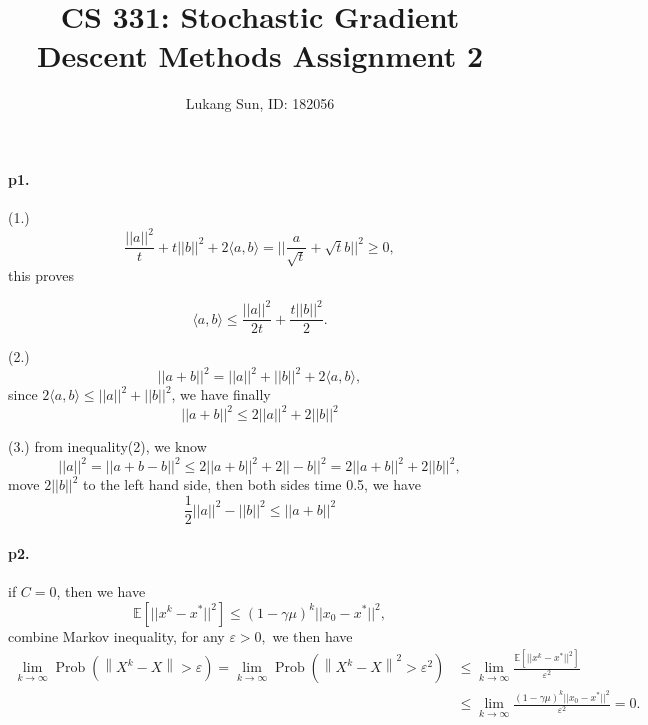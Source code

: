 \documentclass[12pt,a4paper]{article}
\title{CS 331: Stochastic Gradient Descent Methods Assignment 2}
\author{Lukang Sun, ID: 182056}
\begin{document}
	\maketitle
	\paragraph{p1.}
	(1.)\begin{equation*}
		\frac{||a||^2}{t}+t||b||^2+2\langle a,b\rangle = ||\frac{a}{\sqrt{t}}+\sqrt{t}b||^2\geq 0,
	\end{equation*}
	this proves 
	
	\begin{equation}
		\langle a,b\rangle\leq \frac{||a||^2}{2t}+\frac{t||b||^2}{2}.
	\end{equation}
	
	(2.)
	\begin{equation*}
		||a+b||^2=||a||^2+||b||^2+2\langle a,b\rangle,
	\end{equation*}
		since $2\langle a,b\rangle\leq ||a||^2+||b||^2$, we have finally
		\begin{equation}
			||a+b||^2\leq 2||a||^2+2||b||^2
		\end{equation}
	
	(3.)
	from inequality(2), we know
	\begin{equation*}
		||a||^2=||a+b-b||^2\leq 2||a+b||^2+2||-b||^2=2||a+b||^2+2||b||^2,
	\end{equation*}
	 move $2||b||^2$ to the left hand side, then both sides time 0.5, we have 
	 \begin{equation}
	 	\frac{1}{2}||a||^2-||b||^2\leq ||a+b||^2
	 \end{equation}
 
 \paragraph{p2.}
  if $C=0$, then we have 
  \begin{equation*}
  	\mathbb{E}[||x^k-x^*||^2]\leq (1-\gamma \mu)^k||x_0-x^*||^2,
  \end{equation*}
combine Markov inequality, for any $\varepsilon>0,$ we then have 
\begin{equation*}
	\begin{aligned}
		\lim _{k \rightarrow \infty} \operatorname{Prob}\left(\left\|X^{k}-X\right\|>\varepsilon\right)=\lim _{k \rightarrow \infty} \operatorname{Prob}\left(\left\|X^{k}-X\right\|^2>\varepsilon^2\right)& \leq 	\lim _{k \rightarrow \infty}\frac{\mathbb{E}[||x^k-x^*||^2]}{\varepsilon^2}\\
		&\leq \lim_{k \rightarrow \infty}\frac{(1-\gamma \mu)^k||x_0-x^*||^2}{\varepsilon^2}=0.\\
	\end{aligned}
\end{equation*}
\end{document}
